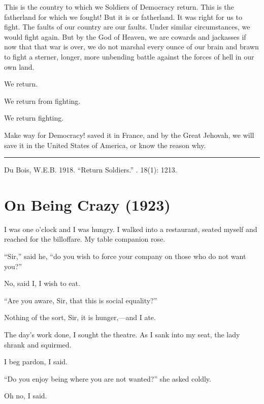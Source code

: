 \documentclass[letterpaper,10pt,english]{jupyterBook}
\begin{document}
\sphinxAtStartPar
This is the country to which we Soldiers of Democracy return. This is the fatherland for which we fought! But it is or fatherland. It was right for us to fight. The faults of our country are our faults. Under similar circumstances, we would fight again. But by the God of Heaven, we are cowards and jackasses if now that that war is over, we do not marshal every ounce of our brain and brawn to fight a sterner, longer, more unbending battle against the forces of hell in our own land.

\sphinxAtStartPar
We return.

\sphinxAtStartPar
We return from fighting.

\sphinxAtStartPar
We return fighting.

\sphinxAtStartPar
Make way for Democracy! saved it in France, and by the Great Jehovah, we will save it in the United States of America, or know the reason why.


\bigskip\hrule\bigskip


\sphinxAtStartPar
{} Du Bois, W.E.B. 1918. “Return Soldiers.” . 18(1): 12\sphinxhyphen{}13.


\section{On Being Crazy (1923)}
\label{\detokenize{Volumes/26/02/on_being_crazy:on-being-crazy-1923}}\label{\detokenize{Volumes/26/02/on_being_crazy::doc}}
\sphinxAtStartPar
I was one o’clock and I was hungry. I walked into a restaurant, seated myself and reached for the bill\sphinxhyphen{}of\sphinxhyphen{}fare. My table companion rose.

\sphinxAtStartPar
“Sir,” said he, “do you wish to force your company on those who do not want you?”

\sphinxAtStartPar
No, said I, I wish to eat.

\sphinxAtStartPar
“Are you aware, Sir, that this is social equality?”

\sphinxAtStartPar
Nothing of the sort, Sir, it is hunger,—and I ate.

\sphinxAtStartPar
The day’s work done, I sought the theatre. As I sank into my seat, the lady shrank and squirmed.

\sphinxAtStartPar
I beg pardon, I said.

\sphinxAtStartPar
“Do you enjoy being where you are not wanted?” she asked coldly.

\sphinxAtStartPar
Oh no, I said.
\end{document}
